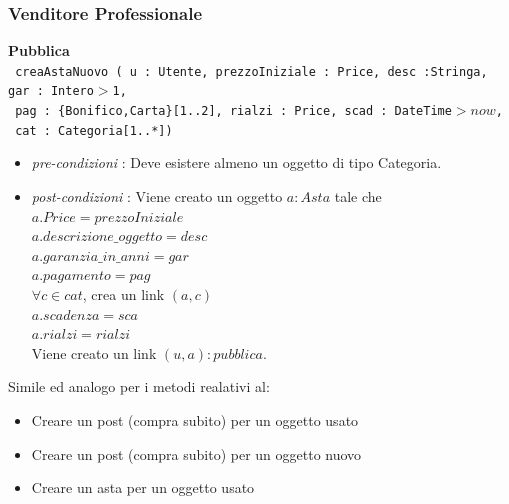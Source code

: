 \documentclass[12pt, letterpaper]{article}
\newcommand{\code}[1]{\colorbox{light-gray}{\texttt{#1}}}
\begin{document}
\subsubsection{Venditore Professionale}
\textbf{Pubblica}\\
\code{ creaAstaNuovo ( u : Utente, prezzoIniziale : Price, desc :Stringa, gar : Intero$>$1,
}\\\code{ pag : \{Bonifico,Carta\}[1..2],
rialzi : Price, scad : DateTime$> now$,}\\\code{ cat : Categoria[1..*])}\begin{itemize}
    \item \textit{pre-condizioni} : Deve esistere almeno un oggetto di tipo Categoria.
    \item \textit{post-condizioni} : Viene creato un oggetto $a:Asta$ tale che\\ 
    $a.Price = prezzoIniziale$\\ 
    $a.descrizione\_oggetto = desc$\\ 
    $a.garanzia\_in\_anni = gar$\\ 
    $a.pagamento = pag$\\
    $\forall c \in cat$, crea un link $(a,c)$\\
    $a.scadenza=sca$ \\
    $a.rialzi=rialzi$\\
    Viene creato un link $(u,a):pubblica$.
\end{itemize}
Simile ed analogo per i metodi realativi al:\begin{itemize}
    \item Creare un post (compra subito) per un oggetto usato 
    \item Creare un post (compra subito) per un oggetto nuovo 
    \item Creare un asta per un oggetto usato
\end{itemize}
\end{document}
